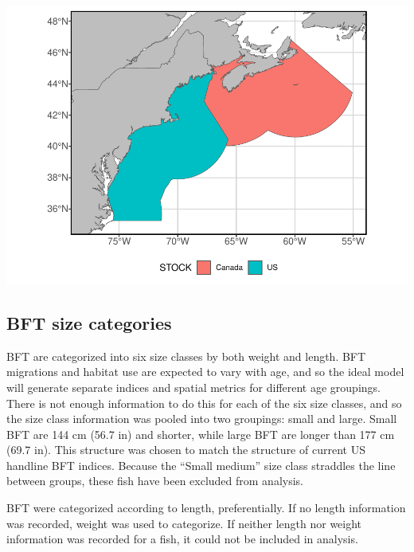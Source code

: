 \documentclass[
]{article}
\let\origfigure\figure
\let\endorigfigure\endfigure
\renewenvironment{figure}[1][2] {
    \expandafter\origfigure\expandafter[H]
} {
    \endorigfigure
}
\begin{document}
\begin{figure}
\centering
\includegraphics{Model_Prelim_Report_files/figure-latex/spatial-domain-1.pdf}
\caption{\label{fig:spatial-domain}Fig. 1: VAST model spatial domain}
\end{figure}

\hypertarget{bft-size-categories}{%
\subsection{BFT size categories}\label{bft-size-categories}}

BFT are categorized into six size classes by both weight and length. BFT migrations and habitat use are expected to vary with age, and so the ideal model will generate separate indices and spatial metrics for different age groupings. There is not enough information to do this for each of the six size classes, and so the size class information was pooled into two groupings: small and large. Small BFT are 144 cm (56.7 in) and shorter, while large BFT are longer than 177 cm (69.7 in). This structure was chosen to match the structure of current US handline BFT indices. Because the ``Small medium'' size class straddles the line between groups, these fish have been excluded from analysis.

BFT were categorized according to length, preferentially. If no length information was recorded, weight was used to categorize. If neither length nor weight information was recorded for a fish, it could not be included in analysis.
\end{document}
